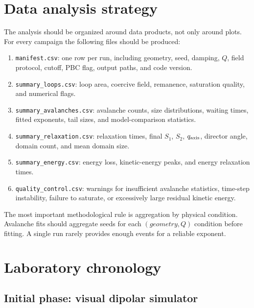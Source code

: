 \documentclass[11pt,a4paper]{article}
\newcommand{\code}[1]{\texttt{#1}}
\begin{document}
\section{Data analysis strategy}
\label{sec:analysis}

The analysis should be organized around data products, not only around plots. For every campaign the following files should be produced:

\begin{enumerate}[leftmargin=*]
\item \code{manifest.csv}: one row per run, including geometry, seed, damping, $Q$, field protocol, cutoff, PBC flag, output paths, and code version.
\item \code{summary\_loops.csv}: loop area, coercive field, remanence, saturation quality, and numerical flags.
\item \code{summary\_avalanches.csv}: avalanche counts, size distributions, waiting times, fitted exponents, tail sizes, and model-comparison statistics.
\item \code{summary\_relaxation.csv}: relaxation times, final $S_1$, $S_2$, $q_{\rm axis}$, director angle, domain count, and mean domain size.
\item \code{summary\_energy.csv}: energy loss, kinetic-energy peaks, and energy relaxation times.
\item \code{quality\_control.csv}: warnings for insufficient avalanche statistics, time-step instability, failure to saturate, or excessively large residual kinetic energy.
\end{enumerate}

The most important methodological rule is aggregation by physical condition. Avalanche fits should aggregate seeds for each $(geometry,Q)$ condition before fitting. A single run rarely provides enough events for a reliable exponent.

\section{Laboratory chronology}
\label{sec:chronology}

\subsection{Initial phase: visual dipolar simulator}
\end{document}
